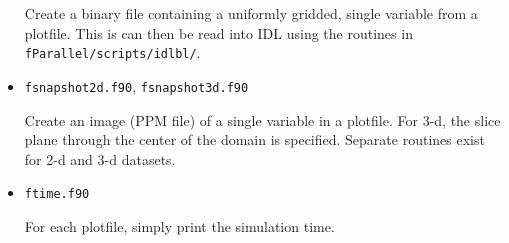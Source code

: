 \begin{itemize}
  Create a binary file containing a uniformly gridded, single variable
  from a plotfile.  This is can then be read into IDL using the routines
  in {\tt fParallel/scripts/idlbl/}.


\item {\tt fsnapshot2d.f90}, {\tt fsnapshot3d.f90}

  Create an image (PPM file) of a single variable in a plotfile.  For
  3-d, the slice plane through the center of the domain is specified.
  Separate routines exist for 2-d and 3-d datasets.
  

\item {\tt ftime.f90}
 
  For each plotfile, simply print the simulation time.


\end{itemize}

